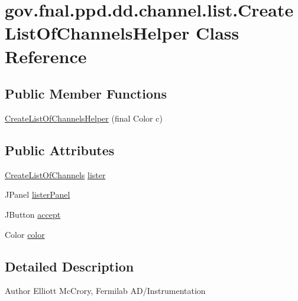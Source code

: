 \hypertarget{classgov_1_1fnal_1_1ppd_1_1dd_1_1channel_1_1list_1_1CreateListOfChannelsHelper}{\section{gov.\-fnal.\-ppd.\-dd.\-channel.\-list.\-Create\-List\-Of\-Channels\-Helper Class Reference}
\label{classgov_1_1fnal_1_1ppd_1_1dd_1_1channel_1_1list_1_1CreateListOfChannelsHelper}
}
\subsection*{Public Member Functions}
\begin{DoxyCompactItemize}
\item 
\hyperlink{classgov_1_1fnal_1_1ppd_1_1dd_1_1channel_1_1list_1_1CreateListOfChannelsHelper_ae6e38ebb57b0247c93a546f613fce2c8}{Create\-List\-Of\-Channels\-Helper} (final Color c)
\end{DoxyCompactItemize}
\subsection*{Public Attributes}
\begin{DoxyCompactItemize}
\item 
\hyperlink{classgov_1_1fnal_1_1ppd_1_1dd_1_1channel_1_1list_1_1CreateListOfChannels}{Create\-List\-Of\-Channels} \hyperlink{classgov_1_1fnal_1_1ppd_1_1dd_1_1channel_1_1list_1_1CreateListOfChannelsHelper_ad9a55e586ea2b5d8775ec9b9bafbc8bf}{lister}
\item 
J\-Panel \hyperlink{classgov_1_1fnal_1_1ppd_1_1dd_1_1channel_1_1list_1_1CreateListOfChannelsHelper_af7f5d450eff8fc117d70ddd5e0621308}{lister\-Panel}
\item 
J\-Button \hyperlink{classgov_1_1fnal_1_1ppd_1_1dd_1_1channel_1_1list_1_1CreateListOfChannelsHelper_a9ee26ae63feb90e8fbf691e14b94ddec}{accept}
\item 
Color \hyperlink{classgov_1_1fnal_1_1ppd_1_1dd_1_1channel_1_1list_1_1CreateListOfChannelsHelper_aa374f73b8da23d1ff27a3faad1a1f678}{color}
\end{DoxyCompactItemize}


\subsection{Detailed Description}
\begin{DoxyAuthor}{Author}
Elliott Mc\-Crory, Fermilab A\-D/\-Instrumentation 
\end{DoxyAuthor}


